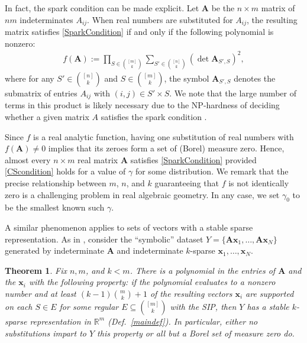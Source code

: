 \documentclass[9pt,twocolumn]{pnas-new}
\newtheorem{theorem}{Theorem}
\begin{document}
In fact, 
the spark condition can be made explicit.  Let $\mathbf{A}$  be the $n \times m$ matrix of $nm$ indeterminates $A_{ij}$. When real numbers are substituted for $A_{ij}$, the resulting matrix satisfies \eqref{SparkCondition} if and only if the following polynomial is nonzero:
\begin{align*}
f(\mathbf{A}) := \prod_{S \in {[m] \choose k}} \sum_{S' \in {[n] \choose k}} (\det \mathbf{A}_{S',S})^2,
\end{align*}
%
where for any $S' \in {[n] \choose k}$ and $S \in {[m] \choose k}$, the symbol $\mathbf{A}_{S',S}$ denotes the submatrix of entries $A_{ij}$ with $(i,j) \in S' \times S$.   We note that the large number of terms in this product is likely necessary due to the NP-hardness of deciding whether a given matrix $A$ satisfies the spark condition \cite{tillmann2014computational}.

Since $f$ is a real analytic function, having one substitution of real numbers with $f(\mathbf{A}) \neq 0$ implies that its zeroes form a set of (Borel) measure zero. Hence, almost every $n \times m$ real matrix $\mathbf{A}$ satisfies \eqref{SparkCondition} provided \eqref{CScondition} holds for a value of $\gamma$ for some distribution. We remark that the precise relationship between $m$, $n$, and $k$ guaranteeing that $f$ is not identically zero is a challenging problem in real algebraic geometry. In any case, we set $\gamma_0$ to be the smallest known such $\gamma$.

A similar phenomenon applies to sets of vectors with a stable sparse representation. As in \cite[Sec.~IV]{Hillar15}, consider the ``symbolic'' dataset $Y = \{\mathbf{A}\mathbf{x}_1,\ldots,\mathbf{A} \mathbf{x}_N\}$ generated by indeterminate $\mathbf{A}$ and indeterminate $k$-sparse $\mathbf{x}_1, \ldots, \mathbf{x}_N$.  

\begin{theorem}\label{robustPolythm} %
Fix $n, m$, and $k < m$. There is a polynomial in the entries of $\mathbf{A}$ and the $\mathbf{x}_i$ with the following property:  if the polynomial evaluates to a nonzero number and at least \mbox{$(k-1){m \choose k}+1$} of the resulting vectors $\mathbf{x}_i$ are supported on each $S \in E$ for some regular $E \subseteq {[m] \choose k}$ with the SIP, then $Y$ has a stable $k$-sparse representation in $\mathbb{R}^m$ (Def.~\ref{maindef}). In particular, either no substitutions impart to $Y$ this property or all but a Borel set of measure zero do. 
\end{theorem}
\end{document}
